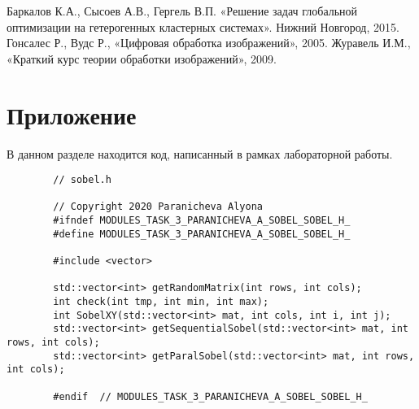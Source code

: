 \documentclass{report}
\begin{document}
	\begin{thebibliography}{1}
		 Баркалов К.А., Сысоев А.В., Гергель В.П. «Решение задач глобальной оптимизации на гетерогенных кластерных системах». Нижний Новгород, 2015. 
		 Гонсалес Р., Вудс Р., «Цифровая обработка изображений», 2005.
		 Журавель И.М., «Краткий курс теории обработки изображений», 2009.
	\end{thebibliography}
	\newpage

	\section*{Приложение}
	В данном разделе находится код, написанный в рамках лабораторной работы.
	\begin{lstlisting}
		// sobel.h

		// Copyright 2020 Paranicheva Alyona
		#ifndef MODULES_TASK_3_PARANICHEVA_A_SOBEL_SOBEL_H_
		#define MODULES_TASK_3_PARANICHEVA_A_SOBEL_SOBEL_H_
		
		#include <vector>
		
		std::vector<int> getRandomMatrix(int rows, int cols);
		int check(int tmp, int min, int max);
		int SobelXY(std::vector<int> mat, int cols, int i, int j);
		std::vector<int> getSequentialSobel(std::vector<int> mat, int rows, int cols);
		std::vector<int> getParalSobel(std::vector<int> mat, int rows, int cols);
		
		#endif  // MODULES_TASK_3_PARANICHEVA_A_SOBEL_SOBEL_H_
	\end{lstlisting}
\end{document}
